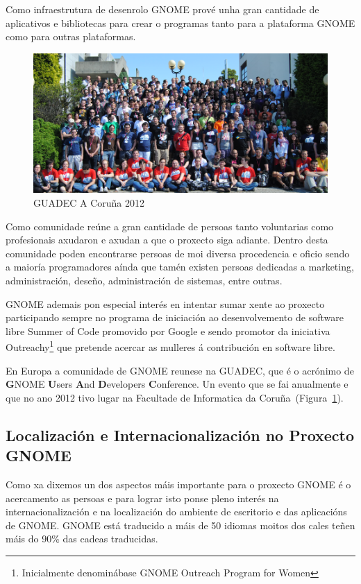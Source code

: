 Como infraestrutura de desenrolo GNOME prové unha gran cantidade de aplicativos e bibliotecas para crear o programas tanto para a plataforma GNOME como para outras plataformas.

\begin{figure}[h!]
    \centering
    \includegraphics[width=\textwidth]{img/guadec_2012.png}
    \caption{GUADEC A Coruña 2012}
    \label{fig:guadec2012}
\end{figure}

Como comunidade reúne a gran cantidade de persoas tanto voluntarias como profesionais axudaron e axudan a que o proxecto siga adiante. Dentro desta comunidade poden encontrarse persoas de moi diversa procedencia e oficio sendo a maioría programadores aínda que tamén existen persoas dedicadas a marketing, administración, deseño, administración de sistemas, entre outras.

GNOME ademais pon especial interés en intentar sumar xente ao proxecto participando sempre no programa de iniciación ao desenvolvemento de software libre Summer of Code promovido por Google e sendo promotor da iniciativa Outreachy\footnote{Inicialmente denominábase GNOME Outreach Program for Women} que pretende acercar as mulleres á contribución en software libre.

En Europa a comunidade de GNOME reunese na GUADEC, que é o acrónimo de \textbf{G}NOME \textbf{U}sers \textbf{A}nd \textbf{D}evelopers \textbf{C}onference. Un evento que se fai anualmente e que no ano 2012 tivo lugar na Facultade de Informatica da Coruña~(Figura~\ref{fig:guadec2012}).

\subsection{Localización e Internacionalización no Proxecto GNOME}
Como xa dixemos un dos aspectos máis importante para o proxecto GNOME é o acercamento as persoas e para lograr isto ponse pleno interés na internacionalización e na localización do ambiente de escritorio e das aplicacións de GNOME. GNOME está traducido a máis de 50 idiomas moitos dos cales teñen máis do 90\% das cadeas traducidas.

